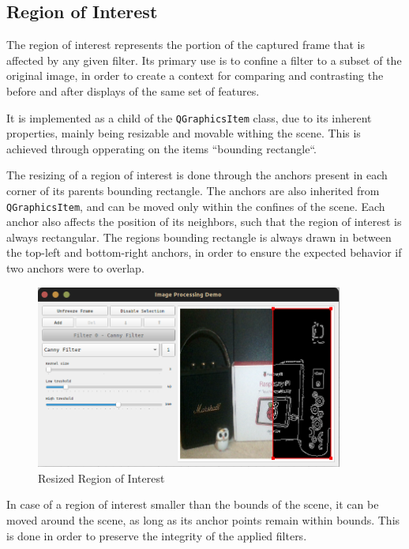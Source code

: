 \subsection{Region of Interest}

The region of interest represents the portion of the captured frame that is affected by any given filter. Its
primary use is to confine a filter to a subset of the original image, in order to create a context for
comparing and contrasting the before and after displays of the same set of features.

It is implemented as a child of the \verb|QGraphicsItem| class, due to its inherent properties, mainly being
resizable and movable withing the scene. This is achieved through opperating on the items ``bounding
rectangle``. \cite{qtDoc}

The resizing of a region of interest is done through the anchors present in each corner of its parents
bounding rectangle. The anchors are also inherited from \verb|QGraphicsItem|, and can be moved only within
the confines of the scene. Each anchor also affects the position of its neighbors, such that the region of
interest is always rectangular. The regions bounding rectangle is always drawn in between the top-left and
bottom-right anchors, in order to ensure the expected behavior if two anchors were to overlap.

\begin{figure}[H]
	\includegraphics[width=0.9\textwidth, height=0.45\textwidth]{resources/Roi_1.png}
	\caption{Resized Region of Interest}
\end{figure}

In case of a region of interest smaller than the bounds of the scene, it can be moved around the scene, as
long as its anchor points remain within bounds. This is done in order to preserve the integrity of the applied
filters.

